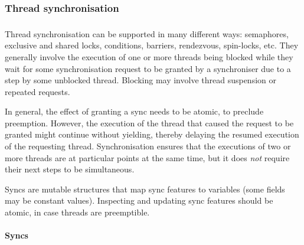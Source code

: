 \subsubsection*{Thread synchronisation}\hypertarget{thread-synchronisation}{}\label{thread-synchronisation}

\begin{align*}
  [ ~ 
  \textsf{Syncs
          } ~ & \textsf{} \\
  \KEY{Datatype} ~ & \NAMEREF{syncs} \\
  \KEY{Funcon} ~ & \NAMEREF{sync-create} \\
  \KEY{Funcon} ~ & \NAMEREF{sync-feature} \\
  \KEY{Funcon} ~ & \NAMEREF{is-sync-feature} \\
  \textsf{Sync} ~ & \textsf{features} \\
  \KEY{Datatype} ~ & \NAMEREF{sync-features} \\
  \KEY{Funcon} ~ & \NAMEREF{sync-waiting-list} \\
  \KEY{Funcon} ~ & \NAMEREF{sync-held} \\
  \KEY{Funcon} ~ & \NAMEREF{sync-holder} \\
  \KEY{Funcon} ~ & \NAMEREF{sync-count} \\
  \KEY{Funcon} ~ & \NAMEREF{sync-feature-create}
  ~ ]
\end{align*}
Thread synchronisation can be supported in many different ways: semaphores,
exclusive and shared locks, conditions, barriers, rendezvous, spin-locks, etc.
They generally involve the execution of one or more threads being blocked
while they wait for some synchronisation request to be granted by a synchroniser
due to a step by some unblocked thread. Blocking may involve thread suspension
or repeated requests.

In general, the effect of granting a sync needs to be atomic, to
preclude preemption. However, the execution of the thread that caused the
request to be granted might continue without yielding, thereby delaying the
resumed execution of the requesting thread. Synchronisation ensures that the
executions of two or more threads are at particular points at the same time,
but it does \emph{not} require their next steps to be simultaneous.

Syncs are mutable structures that map sync features to variables (some fields
may be constant values). Inspecting and updating sync features should be atomic,
in case threads are preemptible.

\paragraph*{Syncs}\hypertarget{syncs}{}\label{syncs}

